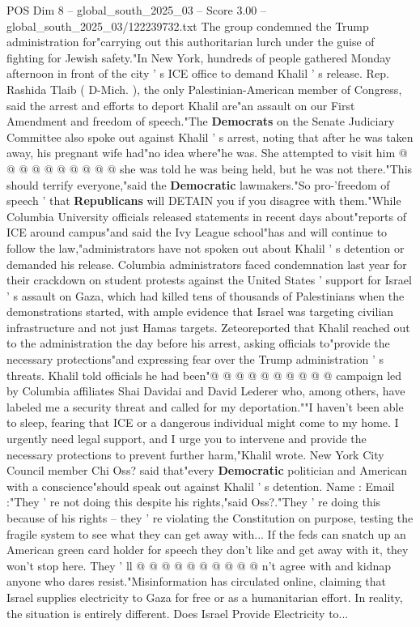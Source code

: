 \begin{textsample}{POS Dim 8 – global\_south\_2025\_03 – Score 3.00 – global\_south\_2025\_03/122239732.txt}
The group condemned the Trump administration for"carrying out this authoritarian lurch under the guise of fighting for Jewish safety."In New York, hundreds of people gathered Monday afternoon in front of the city ' s ICE office to demand Khalil ' s release.
Rep.
Rashida Tlaib ( D-Mich. ), the only Palestinian-American member of Congress, said the arrest and efforts to deport Khalil are"an assault on our First Amendment and freedom of speech."The \textbf{Democrats} on the Senate Judiciary Committee also spoke out against Khalil ' s arrest, noting that after he was taken away, his pregnant wife had"no idea where"he was.
She attempted to visit him @ @ @ @ @ @ @ @ @ @ she was told he was being held, but he was not there."This should terrify everyone,"said the \textbf{Democratic} lawmakers."So pro-'freedom of speech ' that \textbf{Republicans} will DETAIN you if you disagree with them."While Columbia University officials released statements in recent days about"reports of ICE around campus"and said the Ivy League school"has and will continue to follow the law,"administrators have not spoken out about Khalil ' s detention or demanded his release.
Columbia administrators faced condemnation last year for their crackdown on student protests against the United States ' support for Israel ' s assault on Gaza, which had killed tens of thousands of Palestinians when the demonstrations started, with ample evidence that Israel was targeting civilian infrastructure and not just Hamas targets.
Zeteoreported that Khalil reached out to the administration the day before his arrest, asking officials to"provide the necessary protections"and expressing fear over the Trump administration ' s threats.
Khalil told officials he had been"@ @ @ @ @ @ @ @ @ @ campaign led by Columbia affiliates Shai Davidai and David Lederer who, among others, have labeled me a security threat and called for my deportation.""I haven't been able to sleep, fearing that ICE or a dangerous individual might come to my home.
I urgently need legal support, and I urge you to intervene and provide the necessary protections to prevent further harm,"Khalil wrote.
New York City Council member Chi Oss? said that"every \textbf{Democratic} politician and American with a conscience"should speak out against Khalil ' s detention.
Name : Email :"They ' re not doing this despite his rights,"said Oss?."They ' re doing this because of his rights -- they ' re violating the Constitution on purpose, testing the fragile system to see what they can get away with...
If the feds can snatch up an American green card holder for speech they don't like and get away with it, they won't stop here.
They ' ll @ @ @ @ @ @ @ @ @ @ n't agree with and kidnap anyone who dares resist."Misinformation has circulated online, claiming that Israel supplies electricity to Gaza for free or as a humanitarian effort.
In reality, the situation is entirely different.
Does Israel Provide Electricity to...

\end{textsample}
